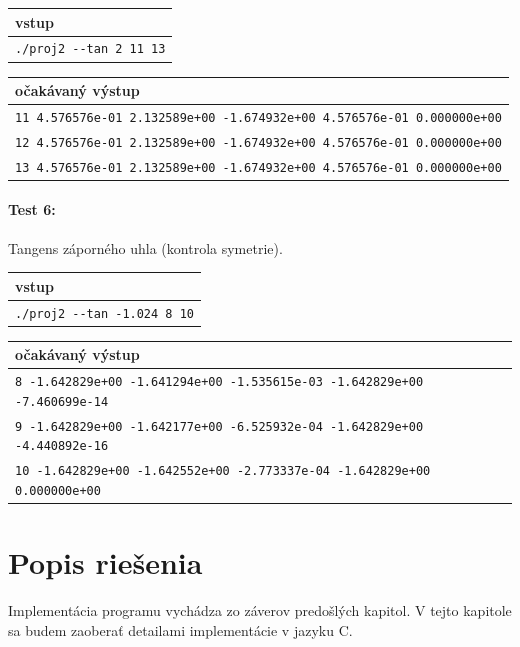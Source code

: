 \documentclass[12pt,a4paper,titlepage,final]{article}
\begin{document}
\vspace{1em}\begin{tabular}{l}
vstup \\
\hline
\verb|./proj2 --tan 2 11 13|
\end{tabular}

\vspace{1em}\begin{tabular}{l}
očakávaný výstup \\
\hline
\verb|11 4.576576e-01 2.132589e+00 -1.674932e+00 4.576576e-01 0.000000e+00| \\
\verb|12 4.576576e-01 2.132589e+00 -1.674932e+00 4.576576e-01 0.000000e+00| \\
\verb|13 4.576576e-01 2.132589e+00 -1.674932e+00 4.576576e-01 0.000000e+00|
\end{tabular}

\paragraph{Test 6:} Tangens záporného uhla (kontrola symetrie).

\vspace{1em}\begin{tabular}{l}
vstup \\
\hline
\verb|./proj2 --tan -1.024 8 10|
\end{tabular}

\vspace{1em}\begin{tabular}{l}
očakávaný výstup \\
\hline
\verb|8 -1.642829e+00 -1.641294e+00 -1.535615e-03 -1.642829e+00 -7.460699e-14| \\
\verb|9 -1.642829e+00 -1.642177e+00 -6.525932e-04 -1.642829e+00 -4.440892e-16| \\
\verb|10 -1.642829e+00 -1.642552e+00 -2.773337e-04 -1.642829e+00 0.000000e+00| 
\end{tabular}


\section{Popis riešenia} \label{riesenie}

Implementácia programu vychádza zo záverov predošlých kapitol. V tejto kapitole sa budem zaoberať detailami implementácie v jazyku C.
\end{document}
